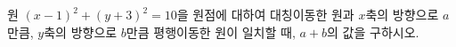 원 $(x-1)^2+(y+3)^2=10$을 원점에 대하여 대칭이동한 원과 $x$축의 방향으로 $a$만큼, $y$축의 방향으로 $b$만큼 평행이동한 원이 일치할 때, $a+b$의 값을 구하시오.
